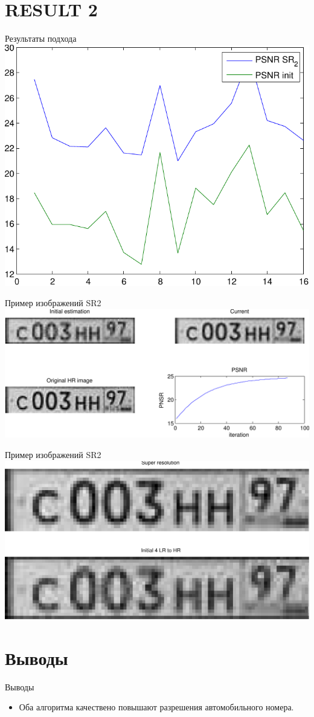 \section{RESULT 2}
\begin{frame}{Результаты подхода}
  \includegraphics[width=\columnwidth]{content/compare_result_sr2.pdf}
\end{frame}
\begin{frame}{Пример изображений SR2}
  \includegraphics[width=\columnwidth]{content/sr2_result_img.pdf}
\end{frame}

\begin{frame}{Пример изображений SR2}
  \includegraphics[width=\columnwidth]{content/sr2_two_images.pdf}
\end{frame}

\section{Выводы}

\begin{frame}{Выводы}
  \begin{itemize}
    \item Оба алгоритма качествено повышают разрешения автомобильного
      номера.
  \end{itemize}
\end{frame}
